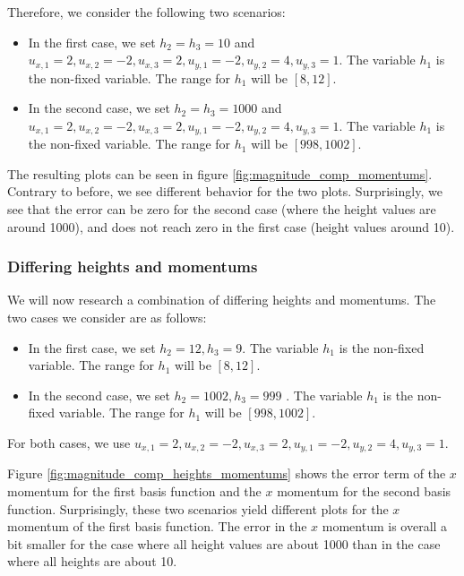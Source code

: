 \documentclass[a4paper, twoside]{article}
\begin{document}
Therefore, we consider the following two scenarios:

\begin{itemize}
\item In the first case, we set $h_2=h_3=10$ and $u_{x,1}=2, u_{x,2}= -2, u_{x,3}= 2, u_{y,1}= -2, u_{y,2}= 4, u_{y,3}=1$. The variable $h_1$ is the non-fixed variable. The range for $h_1$ will be $[8, 12]$.
\item In the second case, we set $h_2=h_3=1000$ and $u_{x,1}=2, u_{x,2}= -2, u_{x,3}= 2, u_{y,1}= -2, u_{y,2}= 4, u_{y,3}=1$. The variable $h_1$ is the non-fixed variable. The range for $h_1$ will be $[998,1002]$.
\end{itemize}



The resulting plots can be seen in figure \ref{fig:magnitude_comp_momentums}. Contrary to before, we see different behavior for the two plots. Surprisingly, we see that the error can be zero for the second case (where the height values are around 1000), and does not reach zero in the first case (height values around 10).

\subsubsection{Differing heights and momentums}
\label{sec:ord1-magnitude-differing-heights-momentums}

We will now research a combination of differing heights and momentums. The two cases we consider are as follows:

\begin{itemize}
\item In the first case, we set $h_2=12, h_3=9$. The variable $h_1$ is the non-fixed variable. The range for $h_1$ will be $[8, 12]$.
\item In the second case, we set $h_2=1002, h_3=999$ . The variable $h_1$ is the non-fixed variable. The range for $h_1$ will be $[998,1002]$.
\end{itemize}

For both cases, we use $u_{x,1}=2, u_{x,2}= -2, u_{x,3}= 2, u_{y,1}= -2, u_{y,2}= 4, u_{y,3}=1$.



Figure \ref{fig:magnitude_comp_heights_momentums} shows the error term of the $x$ momentum for the first basis function and the $x$ momentum for the second basis function. Surprisingly, these two scenarios yield different plots for the $x$ momentum of the first basis function. The error in the $x$ momentum is overall a bit smaller for the case where all height values are about 1000 than in the case where all heights are about 10.
\end{document}
